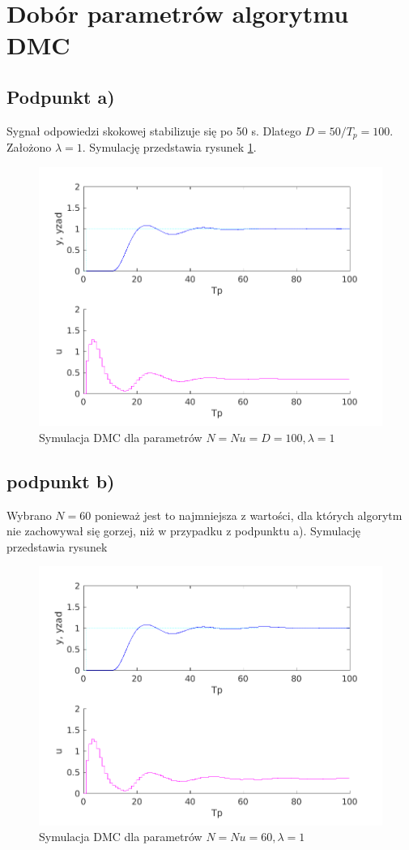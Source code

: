 \documentclass[a4paper, 10pt]{article}
\begin{document}
	\section{Dobór parametrów algorytmu DMC}
	\subsection{Podpunkt a)}
	Sygnał odpowiedzi skokowej stabilizuje się po 50 s. Dlatego $D = 50/T_p = 100$. Założono $\lambda = 1$. Symulację przedstawia rysunek \ref{fig:z5_100_100_100_1}. 
	\begin{figure}
		\centering
		\includegraphics[width=0.7\linewidth]{z5_100_100_100_1.png}
		\caption{Symulacja DMC dla parametrów $N=Nu=D=100, \lambda = 1$}
		\label{fig:z5_100_100_100_1}
	\end{figure}
	\subsection{podpunkt b)}
	Wybrano $N=60$ ponieważ jest to najmniejsza z wartości, dla których algorytm nie zachowywał się gorzej, niż w przypadku z podpunktu a). Symulację przedstawia rysunek 
	\begin{figure}
		\centering
		\includegraphics[width=0.7\linewidth]{z5_60_60_60_1.png}
		\caption{Symulacja DMC dla parametrów $N=Nu=60, \lambda = 1$}
		\label{fig:z5_60_60_60_1}
	\end{figure}
\end{document}
